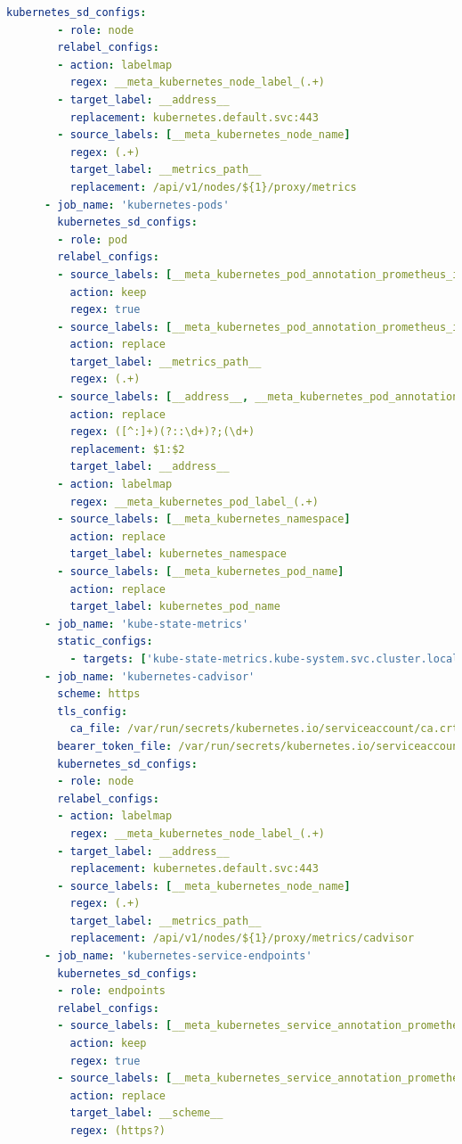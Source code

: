 \begin{itemize}
\begin{lstlisting}[language=yaml]
        kubernetes_sd_configs:
        - role: node
        relabel_configs:
        - action: labelmap
          regex: __meta_kubernetes_node_label_(.+)
        - target_label: __address__
          replacement: kubernetes.default.svc:443
        - source_labels: [__meta_kubernetes_node_name]
          regex: (.+)
          target_label: __metrics_path__
          replacement: /api/v1/nodes/${1}/proxy/metrics
      - job_name: 'kubernetes-pods'
        kubernetes_sd_configs:
        - role: pod
        relabel_configs:
        - source_labels: [__meta_kubernetes_pod_annotation_prometheus_io_scrape]
          action: keep
          regex: true
        - source_labels: [__meta_kubernetes_pod_annotation_prometheus_io_path]
          action: replace
          target_label: __metrics_path__
          regex: (.+)
        - source_labels: [__address__, __meta_kubernetes_pod_annotation_prometheus_io_port]
          action: replace
          regex: ([^:]+)(?::\d+)?;(\d+)
          replacement: $1:$2
          target_label: __address__
        - action: labelmap
          regex: __meta_kubernetes_pod_label_(.+)
        - source_labels: [__meta_kubernetes_namespace]
          action: replace
          target_label: kubernetes_namespace
        - source_labels: [__meta_kubernetes_pod_name]
          action: replace
          target_label: kubernetes_pod_name
      - job_name: 'kube-state-metrics'
        static_configs:
          - targets: ['kube-state-metrics.kube-system.svc.cluster.local:8080']
      - job_name: 'kubernetes-cadvisor'
        scheme: https
        tls_config:
          ca_file: /var/run/secrets/kubernetes.io/serviceaccount/ca.crt
        bearer_token_file: /var/run/secrets/kubernetes.io/serviceaccount/token
        kubernetes_sd_configs:
        - role: node
        relabel_configs:
        - action: labelmap
          regex: __meta_kubernetes_node_label_(.+)
        - target_label: __address__
          replacement: kubernetes.default.svc:443
        - source_labels: [__meta_kubernetes_node_name]
          regex: (.+)
          target_label: __metrics_path__
          replacement: /api/v1/nodes/${1}/proxy/metrics/cadvisor
      - job_name: 'kubernetes-service-endpoints'
        kubernetes_sd_configs:
        - role: endpoints
        relabel_configs:
        - source_labels: [__meta_kubernetes_service_annotation_prometheus_io_scrape]
          action: keep
          regex: true
        - source_labels: [__meta_kubernetes_service_annotation_prometheus_io_scheme]
          action: replace
          target_label: __scheme__
          regex: (https?)

\end{lstlisting}
\end{itemize}
